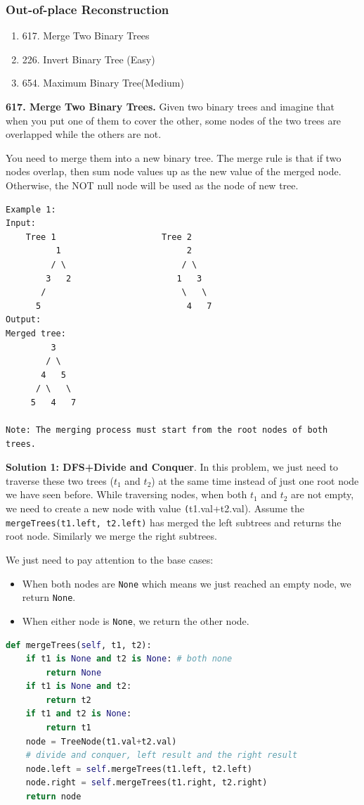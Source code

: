 \documentclass[../main.tex]{subfiles}
\begin{document}
\subsubsection{Out-of-place Reconstruction}
\begin{enumerate}
    \item 617. Merge Two Binary Trees
    \item 226. Invert Binary Tree (Easy)
    \item 654. Maximum Binary Tree(Medium)
\end{enumerate}
\begin{examples}[resume]
\item \textbf{617. Merge Two Binary Trees.} Given two binary trees and imagine that when you put one of them to cover the other, some nodes of the two trees are overlapped while the others are not.

You need to merge them into a new binary tree. The merge rule is that if two nodes overlap, then sum node values up as the new value of the merged node. Otherwise, the NOT null node will be used as the node of new tree.
\begin{lstlisting}[numbers=none]
Example 1:
Input: 
	Tree 1                     Tree 2                  
          1                         2     
         / \                       / \              
        3   2                     1   3                  
       /                           \   \                
      5                             4   7                
Output: 
Merged tree:
	     3
	    / \
	   4   5
	  / \   \ 
	 5   4   7

Note: The merging process must start from the root nodes of both trees.
\end{lstlisting}
\textbf{Solution 1: DFS+Divide and Conquer}. In this problem, we just need to traverse these two trees ($t_1$ and $t_2$) at the same time instead of just one root node we have seen before. While traversing nodes, when both $t_1$ and $t_2$ are not empty, we need to create a new node with value \texttt(t1.val+t2.val). Assume the \texttt{mergeTrees(t1.left, t2.left)} has merged the left subtrees and returns the root node. Similarly we merge the right subtrees. 

We just need to pay attention to the base cases:
\begin{itemize}
    \item When both nodes are \texttt{None} which means we just reached an empty node, we return \texttt{None}. 
    \item When either node is \texttt{None}, we return the other node.
\end{itemize}
\begin{lstlisting}[language=Python]
def mergeTrees(self, t1, t2):
    if t1 is None and t2 is None: # both none
        return None
    if t1 is None and t2:
        return t2
    if t1 and t2 is None:
        return t1
    node = TreeNode(t1.val+t2.val)
    # divide and conquer, left result and the right result
    node.left = self.mergeTrees(t1.left, t2.left)
    node.right = self.mergeTrees(t1.right, t2.right)
    return node
\end{lstlisting}


\end{examples}
\end{document}
